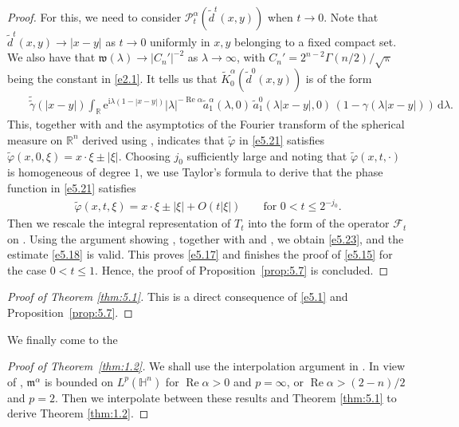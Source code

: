 \documentclass[11pt]{amsproc}
\newcommand{\R}{\mathbb{R}}
\newcommand{\e}{\mathrm{e}}
\newcommand{\fm}{\mathfrak{m}}
\newcommand{\0}{\mathbf{0}}
\newcommand{\fc}{\mathfrak{w}}
\renewcommand{\Re}{\mathop{\mathrm{Re}}}
\renewcommand{\H}{\mathbb{H}}
\renewcommand{\i}{\mathrm{i}}
\renewcommand{\d}{\mathrm{d}}
\numberwithin{equation}{section}
\numberwithin{figure}{section}
\theoremstyle{definition}
\theoremstyle{remark}
\numberwithin{thm}{section}
\begin{document}
\begin{proof}
For this,  we need to consider $\mathscr{P}^\alpha_t(\widetilde{d}^t(x,y))$ when $t\to0$. Note that $\widetilde{d}^t(x,y)\to |x-y|$ as $t\to 0$ uniformly in $x,y$ belonging to a fixed compact set. We also have  that $\fc(\lambda)\to |C_n'|^{-2}$ as $\lambda\to\infty$, with $C_n'=2^{n-2}\Gamma(n/2)/\sqrt\uppi$ being the constant in \eqref{e2.1}.  It tells us  that $\widetilde{K}^\alpha_0(\widetilde{d}^0(x,y))$ is of the form
\begin{eqnarray*}
&&\widetilde{\widetilde{\gamma}}(|x-y|)\int_{\R}\e^{\i\lambda(1-|x-y|)}|\lambda|^{-\Re\alpha}\widetilde{a}^\alpha_1(\lambda,0)\,\widetilde{a}^0_1(\lambda |x-y|,0)\,(1-\gamma(\lambda |x-y|))\,\d\lambda.
\end{eqnarray*}
This, together with \cite[Proposition 6.2.4]{So1} and the asymptotics of the   Fourier transform of the spherical measure on $\R^n$ derived using \cite[Chapter VIII, (15) and (25)]{St1}, indicates that $\widetilde{\varphi}$ in \eqref{e5.21} satisfies $\widetilde{\varphi}(x,0,\xi)=x\cdot\xi\pm|\xi|$. Choosing $j_0$ sufficiently large and noting that $\widetilde{\varphi}(x,t,\cdot)$ is homogeneous of degree $1$, we use  Taylor's formula to derive that the phase function in \eqref{e5.21} satisfies
\begin{eqnarray*}
\widetilde{\varphi}(x,t,\xi)=x\cdot\xi\pm|\xi|+O(t|\xi|) \qquad\mbox{for }0<t\leq 2^{-j_0}.
\end{eqnarray*}
Then  we rescale the integral representation of $T_t$ into the form of the operator $\mathcal{F}_t$ on \cite[p. 192]{So1}. Using the argument showing \cite[Corollary 6.3.3]{So1}, together with \cite[Proposition 3.2]{BeHiSo} and \cite[Theorem 1.4]{GaLiMiXi}, we obtain \eqref{e5.23}, and the estimate \eqref{e5.18} is valid. This proves \eqref{e5.17} and finishes the proof of \eqref{e5.15} for the case $0<t\leq 1$. Hence, the proof of Proposition~\ref{prop:5.7} is concluded. 
\end{proof}



\begin{proof}[Proof of Theorem  \ref{thm:5.1}]
This is a direct consequence of \eqref{e5.1} and Proposition~\ref{prop:5.7}.
\end{proof}




We finally %
come to the
\begin{proof}[Proof of Theorem~\ref{thm:1.2}]
We shall use the interpolation argument in \cite{Ko}. In view of \cite[Theorem 3]{Ko}, $\fm^\alpha$ is bounded on $L^p(\H^n)$ for $\Re\alpha>0$ and $p=\infty$, or $\Re\alpha>(2-n)/2$ and $p=2$. Then we interpolate between these results and Theorem \ref{thm:5.1} to derive Theorem \ref{thm:1.2}.
\end{proof}
\end{document}
